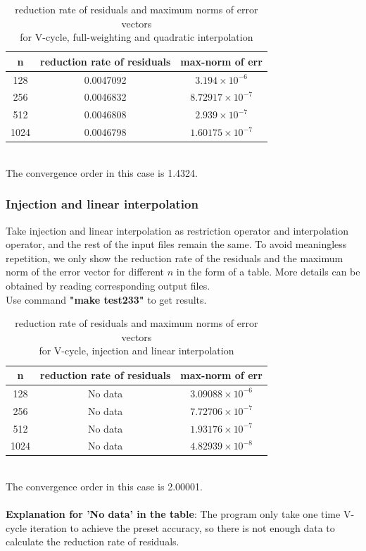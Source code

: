 \documentclass[a4paper,twocolumn]{article}
\theoremstyle{definition}
\begin{document}
\begin{table}[!htp]
	\centering
	\begin{tabular}{|c|c|c|}
		\hline	
		n & reduction rate of residuals & max-norm of err  \\
		\hline		
		128 &0.0047092 & $3.194\times 10^{-6}$ \\
		\hline		
		256 &0.0046832 & $8.72917\times 10^{-7}$ \\
		\hline		
		512 &0.0046808 & $2.939\times 10^{-7}$ \\
		\hline		
		1024 &0.0046798 & $1.60175\times 10^{-7}$ \\
		\hline
	\end{tabular}
	\caption{reduction rate of residuals and maximum norms of error vectors \\for V-cycle, full-weighting and quadratic interpolation}
\end{table}\\
The convergence order in this case is 1.4324.
\subsubsection{Injection and linear interpolation}
Take injection and linear interpolation as restriction operator and interpolation operator, and the rest of the input files remain the same. To avoid meaningless repetition, we only show the reduction rate of the residuals and the maximum norm of the error vector for different $n$ in the form of a table. More details can be obtained by reading corresponding output files.\\
Use command \textbf{"make test233"} to get results. \\
\begin{table}[!htp]
	\centering
	\begin{tabular}{|c|c|c|}
		\hline	
		n &reduction rate of residuals & max-norm of err \\
		\hline		
		128 &No data& $3.09088\times 10^{-6}$ \\
		\hline		
		256 &No data& $7.72706\times 10^{-7}$ \\
		\hline		
		512 &No data& $1.93176\times 10^{-7}$ \\
		\hline		
		1024 &No data& $4.82939\times 10^{-8}$ \\
		\hline
	\end{tabular}
	\caption{reduction rate of residuals and maximum norms of error vectors \\for V-cycle, injection and linear interpolation}
\end{table}\\
The convergence order in this case is 2.00001.\\\\
\textbf{Explanation for 'No data' in the table}: The program only take one time V-cycle iteration to achieve the preset accuracy, so there is not enough data to calculate the reduction rate of residuals.
\newpage
\end{document}
